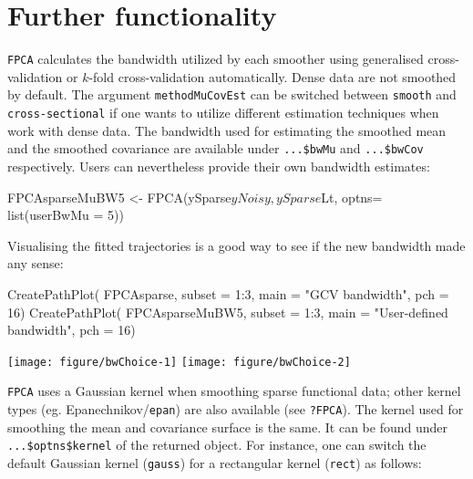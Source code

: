 \documentclass[11pt,english]{article}\usepackage[]{graphicx}\usepackage[]{color}
\begin{document}
\newpage
\section{Further functionality}


\texttt{FPCA} calculates the bandwidth utilized by each smoother using generalised cross-validation or $k$-fold cross-validation automatically. Dense data are not smoothed by default. The argument \texttt{methodMuCovEst} can be switched between \texttt{smooth} and \texttt{cross-sectional} if one wants to utilize different estimation techniques when work with dense data. 
The bandwidth used for estimating the smoothed mean and the smoothed covariance are available under \texttt{...\$bwMu} and \texttt{...\$bwCov} respectively. Users can nevertheless provide their own bandwidth estimates:
\begin{Schunk}
\begin{Sinput}
 FPCAsparseMuBW5 <- FPCA(ySparse$yNoisy, ySparse$Lt, optns= list(userBwMu = 5)) 
\end{Sinput}
\end{Schunk}
Visualising the fitted trajectories is a good way to see if the new bandwidth made any sense:
\begin{Schunk}
\begin{Sinput}
CreatePathPlot( FPCAsparse, subset = 1:3, main = "GCV bandwidth", pch = 16)
CreatePathPlot( FPCAsparseMuBW5, subset = 1:3, main = "User-defined bandwidth", pch = 16)
\end{Sinput}


{\centering \texttt{[image: figure/bwChoice-1]} \texttt{[image: figure/bwChoice-2]} 

}

\end{Schunk}
\texttt{FPCA} uses a Gaussian kernel when smoothing sparse functional data; other kernel types (eg. Epanechnikov/\texttt{epan}) are also available (see \texttt{?FPCA}). The kernel used for smoothing the mean and covariance surface is the same. It can be found under \texttt{...\$optns\$kernel} of the returned object. For instance, one can switch the default Gaussian kernel (\texttt{gauss}) for a rectangular kernel (\texttt{rect}) as follows:
\end{document}
